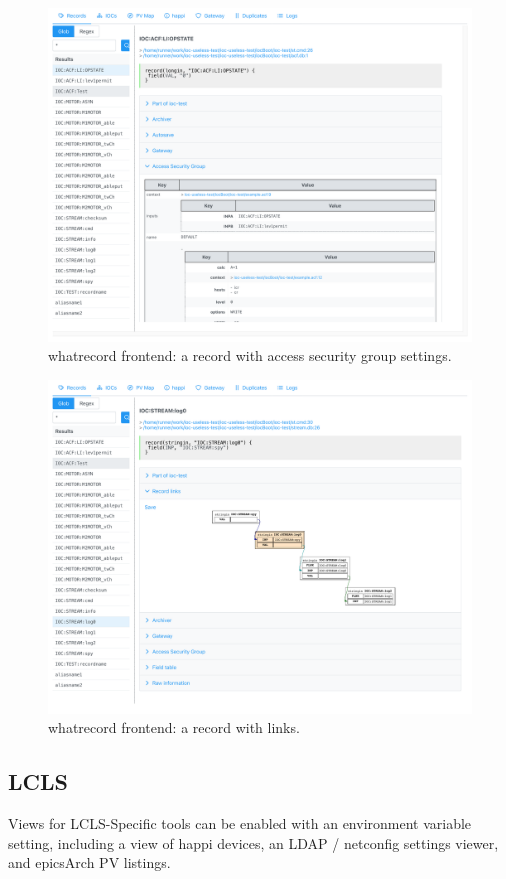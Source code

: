 \documentclass[letter,
               keeplastbox,   %
               ]{jacow}
\begin{document}
\begin{figure}
   \centering
   \includegraphics*[width=.9\columnwidth]{whatrecord-asg}
   \caption{whatrecord frontend: a record with access security group settings.}
   \label{fig:whatrecord-asg}
\end{figure}

\begin{figure}
   \centering
   \includegraphics*[width=.9\columnwidth]{whatrecord-ioc-stream-log0}
   \caption{whatrecord frontend: a record with links.}
   \label{fig:whatrecord-links}
\end{figure}

\subsection{LCLS}
Views for LCLS-Specific tools can be enabled with an environment variable
setting, including a view of happi devices, an LDAP / netconfig settings
viewer, and epicsArch PV listings.
\end{document}

